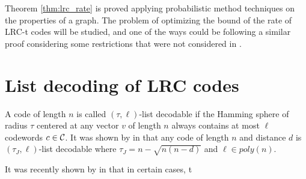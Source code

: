 Theorem \ref{thm:lrc_rate} is proved applying probabilistic method techniques on the properties of a graph. The problem of optimizing the bound of the rate of LRC-t codes will be studied, and one of the ways could be following a similar proof considering some restrictions that were not considered in \cite{bounds_on_LRC}.


\section{List decoding of LRC codes}


A code of length $n$ is called $(\tau,\ell)$-list decodable if the Hamming sphere of radius $\tau$ centered at any vector $v$ of length $n$ always contains at most $\ell$ codewords $c \in {\mathcal C}$. It was shown by \citeauthor{list_decoding} in \cite{list_decoding} that any code of length $n$ and distance $d$ is $(\tau_J, \ell)$-list decodable where $\tau_J = n - \sqrt{n(n-d)}$ and $\ell \in poly(n)$.

It was recently shown by \citeauthor{list_decoding_LRC} in \cite{list_decoding_LRC} that in certain cases, t